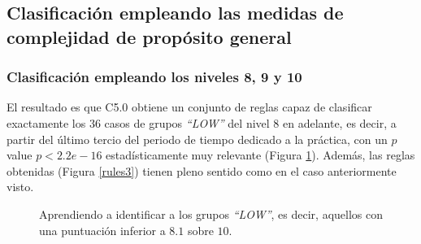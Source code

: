 \subsection{Clasificación empleando las medidas de complejidad de propósito general}

\subsubsection{Clasificación empleando los niveles 8, 9 y 10}

El resultado es que C5.0 obtiene un conjunto de reglas capaz de clasificar exactamente los $36$ casos de grupos \emph{``LOW''} del nivel $8$ en adelante, es decir, a partir del último tercio del periodo de tiempo dedicado a la práctica, con un $p$ value $p < 2.2e-16$ estadísticamente muy relevante (Figura \ref{fig:cm3}). Además, las reglas obtenidas (Figura \ref{rules3}) tienen pleno sentido como en el caso anteriormente visto.

\begin{figure}[H]
\centering
{}
\caption{Aprendiendo a identificar a los grupos \emph{``LOW''}, es decir, aquellos con una puntuación inferior a $8.1$ sobre $10$.}
\label{fig:cm3}
\end{figure}

